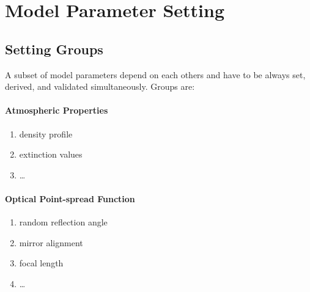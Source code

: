\section{Model Parameter Setting}

\subsection{Setting Groups}

A subset of model parameters depend on each others and have to be always set, derived, and validated simultaneously.
Groups are:

\paragraph{Atmospheric Properties} \label{settingGroup:AtmosphericProperties}
    \begin{enumerate}
        \item density profile
        \item extinction values
        \item \dots
    \end{enumerate}
    
\paragraph{Optical Point-spread Function} \label{settingGroup:opticalPSF}
    \begin{enumerate}
        \item random reflection angle
        \item mirror alignment
        \item focal length
        \item \dots
    \end{enumerate}
    
